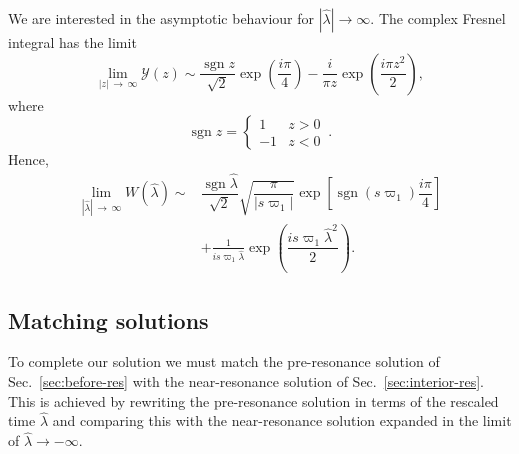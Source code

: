 \documentclass[aps,prd,amsfonts,amssymb,amsmath,nofootinbib,showpacs,superscriptaddress,twocolumn,floatfix]{revtex4-1}
\newcommand{\secref}[1]{Sec.~\ref{sec:#1}}
\newcommand{\recip}[1]{\ensuremath{\frac{1}{#1}}}
\DeclareMathOperator{\sgn}{sgn}
\begin{document}
We are interested in the asymptotic behaviour for $|\widehat{\lambda}| \rightarrow \infty$. The complex Fresnel integral has the limit~\cite{Olver2010} %
\begin{equation}
\lim_{|z|\,\rightarrow\,\infty} \mathcal{Y}(z) \sim \dfrac{\sgn z}{\sqrt{2}} \exp\left(\dfrac{i\pi}{4}\right) - \dfrac{i}{\pi z}\exp\left(\dfrac{i\pi z^2}{2}\right),
\end{equation}
where 
\begin{equation}
\sgn z = \begin{cases}
1 & z > 0 \\
-1 & z < 0
\end{cases}\,.
\end{equation}
Hence,
\begin{align}
\lim_{|\widehat{\lambda}|\,\rightarrow\,\infty}W\left(\widehat{\lambda}\right) \sim {} & \dfrac{\sgn \widehat{\lambda}}{\sqrt{2}}\sqrt{\dfrac{\pi}{|s\varpi_1|}}\exp\left[\sgn(s\varpi_1)\dfrac{i\pi}{4}\right] \nonumber \\
  {} & + \recip{is\varpi_1 \widehat{\lambda}}\exp\left(\dfrac{is \varpi_1 \widehat{\lambda}^2}{2}\right).
\label{eq:Fres-limit}
\end{align}

\subsection{Matching solutions}

To complete our solution we must match the pre-resonance solution of \secref{before-res} with the near-resonance solution of \secref{interior-res}. This is achieved by rewriting the pre-resonance solution in terms of the rescaled time $\widehat{\lambda}$ and comparing this with the near-resonance solution expanded in the limit of $\widehat{\lambda} \rightarrow -\infty$.
\end{document}
